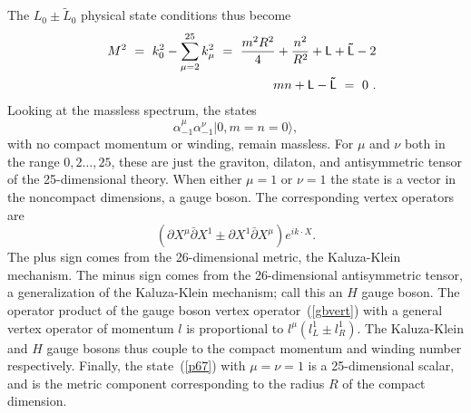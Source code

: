 The $L_0 \pm \tilde L_0$ physical state conditions thus become
\begin{eqnarray}
&& M^2\ =\ k_0^2 - \sum_{\mu = 2}^{25} k_\mu^2 \ =\ \frac{m^2
R^2}{4} + \frac{n^2}{R^2} + {\sf L} + {\sf \tilde L} - 2 \nonumber\\
&& mn + {\sf L} - {\sf \tilde L} \ =\ 0\ .  \label{s1spec}
\end{eqnarray}
Looking at the massless spectrum, the  states
\begin{equation}
\alpha_{-1}^\mu \alpha_{-1}^\nu |0,m=n=0\rangle, \label{p67}
\end{equation}
with no compact momentum or winding, remain massless.  For $\mu$
and $\nu$ both in the range $0, 2\ldots, 25$, these are just the
graviton, dilaton, and antisymmetric tensor of the 25-dimen\-sional
theory.  When either $\mu = 1$ or $\nu = 1$ the state is a
vector in the noncompact dimensions, a gauge boson.  The
corresponding vertex operators are
\begin{equation}
(\partial X^\mu \bar\partial X^{1} \pm 
\partial X^{1} \bar\partial X^\mu ) e^{i k \cdot X}. \label{gbvert}
\end{equation}
The plus sign comes from the 26-dimensional metric, the
Kaluza-Klein mechanism.  The minus sign comes from the
26-dimensional antisymmetric tensor, a generalization of the 
Kaluza-Klein mechanism; call this an $H$ gauge boson.  The
operator product of the gauge boson vertex operator~(\ref{gbvert})
with a general vertex operator of momentum $l$ is proportional to
$l^\mu (l_L^{1} \pm l^{1}_R)$.  The Kaluza-Klein and $H$ gauge
bosons thus couple to the compact momentum and winding number
respectively.  Finally, the state~(\ref{p67}) with $\mu=\nu=1$
is a 25-dimensional scalar, and is the metric component
corresponding to the radius $R$ of the compact dimension.

